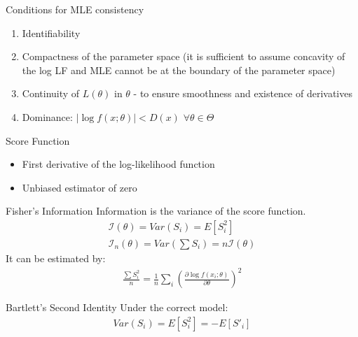 \documentclass[avery5388,grid,frame]{flashcards}
\begin{document}
\begin{flashcard}[Definition]{Conditions for MLE consistency}
 \bigskip
\begin{enumerate}
\item Identifiability 
\item Compactness of the parameter space (it is sufficient to assume concavity of the log LF and MLE cannot be at the boundary of the parameter space)
\item Continuity of $L(\theta)$ in $\theta$ - to ensure smoothness and existence of derivatives
\item Dominance: $|\log f(x;\theta)|<D(x)$  $\forall\theta\in\Theta$
\end{enumerate}
\end{flashcard}
\begin{flashcard}[Definition]{Score Function}
 \bigskip
 \begin{itemize}
\item First derivative of the log-likelihood function
\item Unbiased estimator of zero
\end{itemize}
\end{flashcard}
\begin{flashcard}[Definition]{Fisher's Information}
 \bigskip
Information is the variance of the score function.
{\begin{align*}
\mathcal{I}(\theta)=Var(S_i)=E[S_i^2]\\
\mathcal{I}_n(\theta)=Var\left(\sum S_i\right)=n\mathcal{I}(\theta)
\end{align*}}
It can be estimated by:
{\begin{align*}
\frac{\sum S_i^2}{n}=\frac{1}{n}\sum_i\left(\frac{\partial \log f(x_i;\theta)}{\partial\theta}\right)^2
\end{align*}}
\end{flashcard}
\begin{flashcard}[Definition]{Bartlett's Second Identity}
 \bigskip \bigskip\bigskip\bigskip
Under the correct model:
{\begin{align*}
Var(S_i)=E[S_i^2]=-E[S'_i]
\end{align*}}
\end{flashcard}
\end{document}

